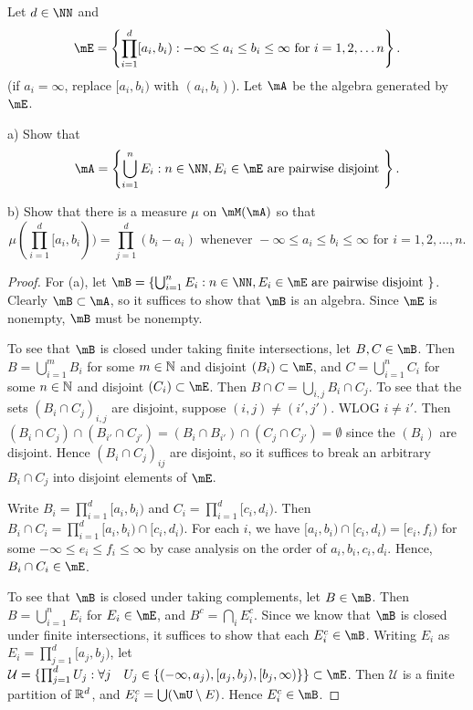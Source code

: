 \documentclass{article}
\begin{document}
 Let $d \in \NN$ and 
$$\mE = \left\{ \prod_{i=1}^d [a_i, b_i) : -\infty \le a_i \le b_i \le \infty \text{ for } i = 1,2, \ldots n \right\}.$$
(if $a_i = \infty$, replace $[a_i, b_i)$ with $(a_i, b_i)$). Let $\mA$ be the algebra generated by $\mE$.

a) Show that 
$$\mA = \left\{ \bigcup_{i=1}^n E_i : n\in \NN, E_i \in \mE \text{ are pairwise disjoint } \right\}.$$

b) Show that there is a measure $\mu$ on $\mM(\mA)$ so that 
$$\mu(\prod_{i=1}^d [a_i, b_i)) = \prod_{j=1}^d (b_i - a_i) \text{ whenever } -\infty \le a_i \le b_i \le \infty \text{ for } i = 1,2, \ldots, n.$$

\begin{proof}
For (a), let $\mB = \left\{ \bigcup_{i=1}^n E_i : n\in \NN, E_i \in \mE \text{ are pairwise disjoint } \right\}$.  Clearly $\mB \subset \mA$, so it suffices to show that $\mB$ is an algebra. Since $\mE$ is nonempty, $\mB$ must be nonempty.  

To see that $\mB$ is closed under taking finite intersections,  let $B,C \in \mB$. Then $B = \bigcup_{i=1}^m B_i$ for some $m \in \mathbb{N}$ and disjoint $(B_i) \subset \mE$, and $C = \bigcup_{i=1}^n C_i$ for some $n \in \mathbb{N}$ and disjoint $(C_i) \subset \mE$. Then $B \cap C = \bigcup_{i,j} B_i \cap C_j$. To see that the sets $(B_i \cap C_j)_{i,j}$ are disjoint, suppose $(i,j) \neq (i',j')$.  WLOG $i \neq i'$. Then $(B_i \cap C_j) \cap (B_{i'} \cap C_{j'}) = (B_i \cap B_{i'}) \cap (C_j \cap C_{j'}) = \emptyset$ since the $(B_i)$ are disjoint.  Hence $(B_i \cap C_j)_{ij}$ are disjoint, so it suffices to break an arbitrary $B_i \cap C_j$ into disjoint elements of $\mE$. 

Write $B_i = \prod_{i=1}^d [a_i, b_i)$ and $C_i = \prod_{i=1}^d [c_i, d_i)$.  Then $B_i \cap C_i = \prod_{i=1}^d [a_i, b_i) \cap [c_i, d_i)$.  For each $i$, we have $[a_i, b_i) \cap [c_i, d_i) = [e_i, f_i)$ for some $-\infty \le e_i \le f_i \le \infty$ by case analysis on the order of $a_i, b_i, c_i, d_i$.  Hence, $B_i \cap C_i \in \mE$.

To see that $\mB$ is closed under taking complements, let $B \in \mB$. Then $B = \bigcup_{i=1}^n E_i$ for $E_i \in \mE$, and $B^c = \bigcap_i E_i^c$.  Since we know that $\mB$ is closed under finite intersections, it suffices to show that each $E_i^c \in \mB$.  Writing $E_i$ as $E_i = \prod_{j=1}^d [a_j, b_j)$, let $\mathcal U = \{\prod_{j=1}^d U_j : \forall j \quad U_j \in \{ (-\infty, a_j), [a_j, b_j), [b_j,\infty) \} \} \subset \mE$.  Then $\mathcal U$ is a  finite partition of $\mathbb{R}^d$, and $E_i^c = \bigcup (\mU \setminus E)$.  Hence $E_i^c \in \mB$.


\end{proof}
\end{document}

